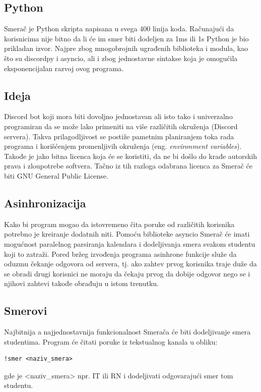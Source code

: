 \documentclass[a4paper,11pt]{article}
\begin{document}
\subsection{Python}
Smerač je Python\cite{python} skripta napisana u svega 400 linija koda. Računajući da korisnicima nije bitno da li će im smer biti dodeljen za 1ms ili 1s Python je bio prikladan izvor. Najpre zbog mnogobrojnih ugrađenih biblioteka i modula, kao što su discordpy\cite{discordpy} i asyncio, ali i zbog jednostavne sintakse koja je omogućila eksponencijalan razvoj ovog programa.
\subsection{Ideja}
Discord bot koji mora biti dovoljno jednostavan ali isto tako i univerzalno programiran da se može lako primeniti na više različitih okruženja (Discord servera). Takva prilagodljivost se postiže pametnim planiranjem toka rada programa i korišćenjem promenljivih okruženja (eng. \textit{environment variables}). Takođe je jako bitna licenca koja će se koristiti, da ne bi došlo do krađe autorskih prava i zloupotrebe softvera. Tačno iz tih razloga odabrana licenca za Smerač će biti GNU General Public License\cite{gpl}.
\subsection{Asinhronizacija}
Kako bi program mogao da istovremeno čita poruke od različitih korisnika potrebno je kreiranje dodatnih niti. Pomoću biblioteke asyncio\cite{asyncio} Smerač će imati mogućnost paralelnog parsiranja kalendara i dodeljivanja smera svakom studentu koji to zatraži. Pored bržeg izvođenja programa asinhrone funkcije služe da oduzmu čekanje odgovora od servera, tj. ako zahtev prvog korisnika traje duže da se obradi drugi korisnici ne moraju da čekaju prvog da dobije odgovor nego se i njihovi zahtevi takođe obrađuju u istom trenutku.
\subsection{Smerovi}
Najbitnija a najjednostavnija funkcionalnost Smerača će biti dodeljivanje smera studentima. Program će čitati poruke iz tekstualnog kanala u obliku:
\begin{verbatim}
!smer <naziv_smera>
\end{verbatim}
gde je <naziv\_smera> npr. IT ili RN i dodeljivati odgovarajući smer tom studentu.
\newpage
\end{document}

